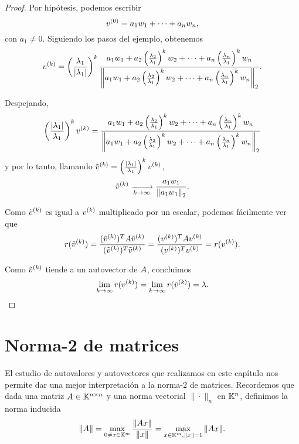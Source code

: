 \begin{proof}
Por hipótesis, podemos escribir
$$
\vb^{(0)} = a_1 \wb_1 + \dots + a_n \wb_n,
$$
con $a_1 \neq 0$.
Siguiendo los pasos del ejemplo, obtenemos
$$
\vb^{(k)} = \left(\frac{\lambda_1}{|\lambda_1|}\right)^k \frac{a_1 \wb_1 + a_2 \left(\frac{\lambda_2}{\lambda_1}\right)^k \wb_2 + \dots + a_n \left(\frac{\lambda_n}{\lambda_1}\right)^k \wb_n}{\left\|a_1 \wb_1 + a_2 \left(\frac{\lambda_2}{\lambda_1}\right)^k  \wb_2 + \dots + a_n \left(\frac{\lambda_n}{\lambda_1}\right)^k \wb_n\right\|_2}.
$$

Despejando,
$$
\left(\frac{|\lambda_1|}{\lambda_1}\right)^k \vb^{(k)} = \frac{a_1 \wb_1 + a_2 \left(\frac{\lambda_2}{\lambda_1}\right)^k \wb_2 + \dots + a_n \left(\frac{\lambda_n}{\lambda_1}\right)^k \wb_n}{\left\|a_1 \wb_1 + a_2 \left(\frac{\lambda_2}{\lambda_1}\right)^k \wb_2 + \dots + a_n \left(\frac{\lambda_n}{\lambda_1}\right)^k \wb_n\right\|_2}
$$
y por lo tanto, llamando $\tilde \vb^{(k)} = \left(\frac{|\lambda_1|}{\lambda_1}\right)^k \vb^{(k)}$,
$$
\tilde \vb^{(k)} \xrightarrow[k \rightarrow \infty]{} \frac{a_1 \wb_1}{\left\|a_1 \wb_1\right\|_2}.
$$

Como $\tilde \vb^{(k)}$ es igual a $\vb^{(k)}$ multiplicado por un escalar, podemos fácilmente ver que
$$
r(\tilde \vb^{(k)}) = \frac{(\tilde \vb^{(k)})^T \Ab \tilde \vb^{(k)}}{(\tilde \vb^{(k)})^T  \tilde \vb^{(k)}} = \frac{(\vb^{(k)})^T \Ab \vb^{(k)}}{( \vb^{(k)})^T  \vb^{(k)}} = r(\vb^{(k)}).
$$


Como $\tilde \vb^{(k)}$ tiende a un autovector de $\Ab$, concluimos
$$
\lim_{k \rightarrow \infty} r(\vb^{(k)}) = \lim_{k \rightarrow \infty} r(\tilde \vb^{(k)}) = \lambda.
$$
\end{proof}



\section{Norma-2 de matrices}

El estudio de autovalores y autovectores que realizamos en este capítulo nos permite  dar una mejor interpretación a la norma-2 de matrices. Recordemos que dada una matriz $\Ab \in \Knn$ y una norma vectorial $\|\cdot\|_n$ en $\mathbb K^n$, definimos la norma inducida
$$
\|\Ab\| = \max_{\cero \neq \xb \in \K^m} \frac{\|\Ab\xb\|}{\|\xb\|} = \max_{\xb \in \K^m, \|\xb\| = 1} \|\Ab\xb\|.
$$

